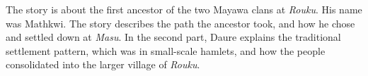 The story is about the first ancestor of the two Mayawa clans at \textit{Rouku}. His name was Mathkwi. The story describes the path the ancestor took, and how he chose and settled down at \textit{Masu}. In the second part, Daure explains the traditional settlement pattern, which was in small-scale hamlets, and how the people consolidated into the larger village of \textit{Rouku}.